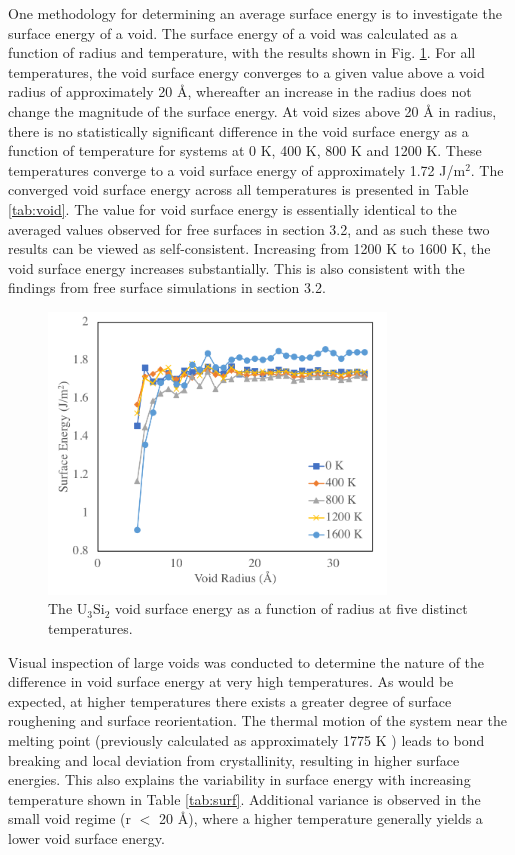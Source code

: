 \documentclass[review]{elsarticle}
\begin{document}
One methodology for determining an average surface energy is to investigate the surface energy of a void. The surface energy of a void was calculated as a function of radius and temperature, with the results shown in Fig. \ref{fig:void}. For all temperatures, the void surface energy converges to a given value above a void radius of approximately 20 {\AA}, whereafter an increase in the radius does not change the magnitude of the surface energy. At void sizes above 20 {\AA} in radius, there is no statistically significant difference in the void surface energy as a function of temperature for systems at 0 K, 400 K, 800 K and 1200 K. These temperatures converge to a void surface energy of approximately 1.72 J/m$^{2}$. The converged void surface energy across all temperatures is presented in Table \ref{tab:void}. The value for void surface energy is essentially identical to the averaged values observed for free surfaces in section 3.2, and as such these two results can be viewed as self-consistent. Increasing from 1200 K to 1600 K, the void surface energy increases substantially. This is also consistent with the findings from free surface simulations in section 3.2. 

\begin{figure}[h]
 \centering
 \includegraphics[width=0.8\textwidth]{void_vs_rc.png} 
 \caption{The U$_{3}$Si$_{2}$ void surface energy as a function of radius at five distinct temperatures. }
 \label{fig:void}
\end{figure}



Visual inspection of large voids was conducted to determine the nature of the difference in void surface energy at very high temperatures. As would be expected, at higher temperatures there exists a greater degree of surface roughening and surface reorientation. The thermal motion of the system near the melting point (previously calculated as approximately 1775 K \cite{beelerUSi}) leads to bond breaking and local deviation from crystallinity, resulting in higher surface energies. This also explains the variability in surface energy with increasing temperature shown in Table \ref{tab:surf}. Additional variance is observed in the small void regime (r $<$ 20 {\AA}), where a higher temperature generally yields a lower void surface energy. 
\end{document}
